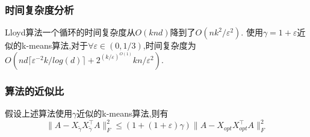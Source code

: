 \documentclass{ctexart}
\begin{document}
    \subsubsection{时间复杂度分析}
    Lloyd算法一个循环的时间复杂度从$O(knd)$降到了$O(nk^2/\varepsilon^2)$.
    使用$\gamma = 1 + \varepsilon$近似的k-means算法,对于$\forall \varepsilon \in (0, 1/3)$,时间复杂度为$O(nd\lceil\varepsilon^{-2}k/log(d)\rceil + 2^{(k/\varepsilon)^{O(1)}}kn/\varepsilon^2)$.

    \subsubsection{算法的近似比}
    假设上述算法使用$\gamma$近似的k-means算法,则有
    \begin{equation*}
        \| A - X_{\tilde{\gamma}}X_{\tilde{\gamma}}^{\top}A \|_{F}^2 \le (1+(1+\varepsilon)\gamma) \| A - X_{opt}X_{opt}^{\top}A \|_{F}^2
    \end{equation*}
\end{document}
